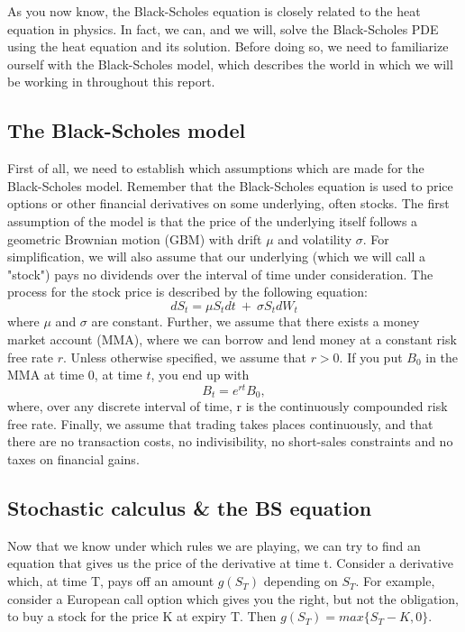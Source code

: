 As you now know, the Black-Scholes equation is closely related to the heat equation in physics. In fact, we can, and we will, solve the Black-Scholes PDE using the heat equation and its solution. Before doing so, we need to familiarize ourself with the Black-Scholes model, which describes the world in which we will be working in throughout this report. 
 
\subsection{The Black-Scholes model}

First of all, we need to establish which assumptions which are made for the Black-Scholes model. Remember that the Black-Scholes equation is used to price options or other financial derivatives on some underlying, often stocks. The first assumption of the model is that the price of the underlying itself follows a geometric Brownian motion (GBM) with drift $\mu$ and volatility $\sigma$. For simplification, we will also assume that our underlying (which we will call a  "stock") pays no dividends over the interval of time under consideration. The process for the stock price is described by the following equation:
\begin{equation*}
    dS_t = \mu S_tdt~+~\sigma S_tdW_t
\end{equation*}
where $\mu$ and $\sigma$ are constant. 
Further, we assume that there exists a money market account (MMA), where we can borrow and lend money at a constant risk free rate $r$. Unless otherwise specified, we assume that $r>0$. If you put $B_0$ in the MMA at time $0$, at time $t$, you end up with
\begin{equation*}
    B_t = e^{rt}B_0,
\end{equation*}
where, over any discrete interval of time, r is the continuously compounded risk free rate. Finally, we assume that trading takes places continuously, and that there are no transaction costs, no indivisibility, no short-sales constraints and no taxes on financial gains. 

\subsection{Stochastic calculus \& the BS equation}
Now that we know under which rules we are playing, we can try to find an equation that gives us the price of the derivative at time t. Consider a derivative which, at time T, pays off an amount $g(S_T)$ depending on $S_T$. For example, consider a European call option which gives you the right, but not the obligation, to buy a stock for the price K at expiry T. Then $g(S_T) = max\{S_T-K, 0\}$. 

